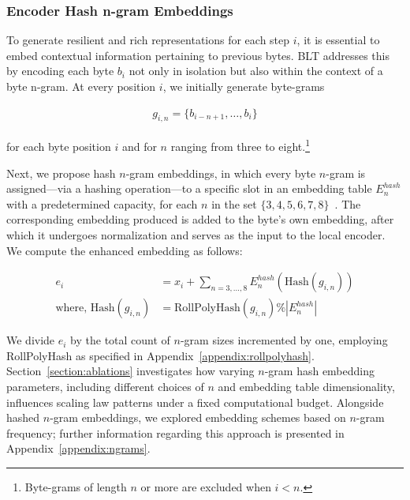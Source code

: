\subsubsection{Encoder Hash n-gram Embeddings}
\label{sec:ngram-emb}
\label{sec:hash-emb}
To generate resilient and rich representations for each step $i$, it is essential to embed contextual information pertaining to previous bytes. {\textsc BLT} addresses this by encoding each byte $b_i$ not only in isolation but also within the context of a byte n-gram. At every position $i$, we initially generate byte-grams

\begin{align}
    g_{i,n}=\{b_{i-n + 1},\ldots, b_i\}
\end{align}

for each byte position $i$ and for $n$ ranging from three to eight.\footnote{
Byte-grams of length $n$ or more are excluded when $i < n$. }

Next, we propose hash $n$-gram embeddings, in which every byte $n$-gram is assigned—via a hashing operation—to a specific slot in an embedding table $E_{n}^{hash}$ with a predetermined capacity, for each $n$ in the set $\{3,4,5,6,7,8\}$~\citep{bai2010learning}. The corresponding embedding produced is added to the byte’s own embedding, after which it undergoes normalization and serves as the input to the local encoder. We compute the enhanced embedding as follows:

\begin{align}
e_i &= x_i + \sum_{n = 3,...,8}E_{n}^{hash}(\text{Hash}(g_{i,n})) \\
\text{where, Hash}(g_{i,n}) &= \text{RollPolyHash}(g_{i,n}) \% |E_{n}^{hash}|
\end{align}

We divide $e_i$ by the total count of $n$-gram sizes incremented by one, employing RollPolyHash as specified in Appendix~\ref{appendix:rollpolyhash}. Section~\ref{section:ablations} investigates how varying $n$-gram hash embedding parameters, including different choices of $n$ and embedding table dimensionality, influences scaling law patterns under a fixed computational budget. Alongside hashed $n$-gram embeddings, we explored embedding schemes based on $n$-gram frequency; further information regarding this approach is presented in Appendix~\ref{appendix:ngrams}.

